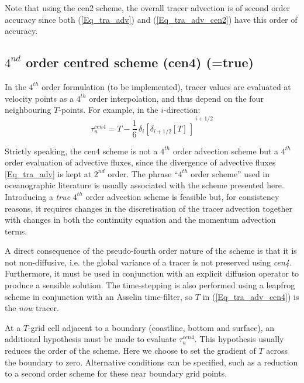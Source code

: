 Note that using the cen2 scheme, the overall tracer advection is of second 
order accuracy since both (\ref{Eq_tra_adv}) and (\ref{Eq_tra_adv_cen2}) 
have this order of accuracy. 

\subsection   [$4^{nd}$ order centred scheme (cen4) (\np{ln\_traadv\_cen4})]
		     {$4^{nd}$ order centred scheme (cen4) (=true)}
\label{TRA_adv_cen4}

In the $4^{th}$ order formulation (to be implemented), tracer values are 
evaluated at velocity points as a $4^{th}$ order interpolation, and thus depend on 
the four neighbouring $T$-points. For example, in the $i$-direction:
\begin{equation} \label{Eq_tra_adv_cen4}
\tau _u^{cen4} 
=\overline{   T - \frac{1}{6}\,\delta _i \left[ \delta_{i+1/2}[T] \,\right]   }^{\,i+1/2}
\end{equation}

Strictly speaking, the cen4 scheme is not a $4^{th}$ order advection scheme 
but a $4^{th}$ order evaluation of advective fluxes, since the divergence of 
advective fluxes \eqref{Eq_tra_adv} is kept at $2^{nd}$ order. The phrase ``$4^{th}$ 
order scheme'' used in oceanographic literature is usually associated 
with the scheme presented here. Introducing a \textit{true} $4^{th}$ order advection 
scheme is feasible but, for consistency reasons, it requires changes in the 
discretisation of the tracer advection together with changes in both the 
continuity equation and the momentum advection terms.  

A direct consequence of the pseudo-fourth order nature of the scheme is that 
it is not non-diffusive, i.e. the global variance of a tracer is not preserved using 
\textit{cen4}. Furthermore, it must be used in conjunction with an explicit 
diffusion operator to produce a sensible solution. The time-stepping is also 
performed using a leapfrog scheme in conjunction with an Asselin time-filter, 
so $T$ in (\ref{Eq_tra_adv_cen4}) is the \textit{now} tracer.

At a $T$-grid cell adjacent to a boundary (coastline, bottom and surface), an 
additional hypothesis must be made to evaluate $\tau _u^{cen4}$. This 
hypothesis usually reduces the order of the scheme. Here we choose to set 
the gradient of $T$ across the boundary to zero. Alternative conditions can be 
specified, such as a reduction to a second order scheme for these near boundary 
grid points.

